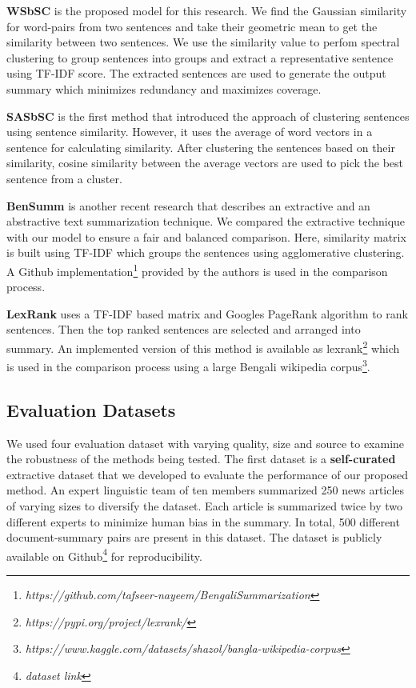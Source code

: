 \documentclass[acmlarge]{acmart}
\begin{document}
\textbf{WSbSC} is the proposed model for this research. We find the Gaussian similarity for word-pairs from two sentences and take their geometric mean to get the similarity between two sentences. We use the similarity value to perfom spectral clustering to group sentences into groups and extract a representative sentence using TF-IDF score. The extracted sentences are used to generate the output summary which minimizes redundancy and maximizes coverage.

\textbf{SASbSC} \cite{roychowdhury-etal-2022-spectral-base} is the first method that introduced the approach of clustering sentences using sentence similarity. However, it uses the average of word vectors in a sentence for calculating similarity. After clustering the sentences based on their similarity, cosine similarity between the average vectors are used to pick the best sentence from a cluster.

\textbf{BenSumm} \cite{chowdhury-etal-2021-tfidf-clustering} is another recent research that describes an extractive and an abstractive text summarization technique. We compared the extractive technique with our model to ensure a fair and balanced comparison. Here, similarity matrix is built using TF-IDF which groups the sentences using agglomerative clustering. A Github implementation\footnote{\textit{https://github.com/tafseer-nayeem/BengaliSummarization}} provided by the authors is used in the comparison process.

\textbf{LexRank} \cite{Erkan-lexRank-2004} uses a TF-IDF based matrix and Googles PageRank algorithm \cite{page-PageRank-1999} to rank sentences. Then the top ranked sentences are selected and arranged into summary. An implemented version of this method is available as lexrank\footnote{\textit{https://pypi.org/project/lexrank/}} which is used in the comparison process using a large Bengali wikipedia corpus\footnote{\textit{https://www.kaggle.com/datasets/shazol/bangla-wikipedia-corpus}}.

\subsection{Evaluation Datasets}\label{subsec:evaluation-datasets}
We used four evaluation dataset with varying quality, size and source to examine the robustness of the methods being tested. The first dataset is a \textbf{self-curated} extractive dataset that we developed to evaluate the performance of our proposed method. An expert linguistic team of ten members summarized 250 news articles of varying sizes to diversify the dataset. Each article is summarized twice by two different experts to minimize human bias in the summary. In total, 500 different document-summary pairs are present in this dataset. The dataset is publicly available on Github\footnote{\textit{dataset link}} for reproducibility.
\end{document}
